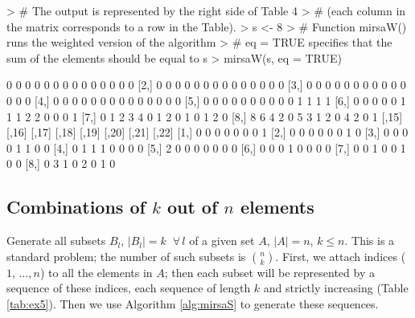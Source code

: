 \documentclass[11pt]{article}
\begin{document}
\begin{Schunk}
\begin{Sinput}
> # The output is represented by the right side of Table 4
> # (each column in the matrix corresponds to a row in the Table).
> s <- 8
> # Function mirsaW() runs the weighted version of the algorithm 
> # eq = TRUE specifies that the sum of the elements should be equal to s 
> mirsaW(s, eq = TRUE)  
\end{Sinput}
\begin{Soutput}
     [,1] [,2] [,3] [,4] [,5] [,6] [,7] [,8] [,9] [,10] [,11] [,12] [,13] [,14]
[1,]    0    0    0    0    0    0    0    0    0     0     0     0     0     0
[2,]    0    0    0    0    0    0    0    0    0     0     0     0     0     0
[3,]    0    0    0    0    0    0    0    0    0     0     0     0     0     0
[4,]    0    0    0    0    0    0    0    0    0     0     0     0     0     0
[5,]    0    0    0    0    0    0    0    0    0     0     1     1     1     1
[6,]    0    0    0    0    0    1    1    1    2     2     0     0     0     1
[7,]    0    1    2    3    4    0    1    2    0     1     0     1     2     0
[8,]    8    6    4    2    0    5    3    1    2     0     4     2     0     1
     [,15] [,16] [,17] [,18] [,19] [,20] [,21] [,22]
[1,]     0     0     0     0     0     0     0     1
[2,]     0     0     0     0     0     0     1     0
[3,]     0     0     0     0     1     1     0     0
[4,]     0     1     1     1     0     0     0     0
[5,]     2     0     0     0     0     0     0     0
[6,]     0     0     0     1     0     0     0     0
[7,]     0     0     1     0     0     1     0     0
[8,]     0     3     1     0     2     0     1     0
\end{Soutput}
\end{Schunk}

\subsection{Combinations of $k$ out of $n$ elements} \label{sec:ex5}

Generate all subsets $B_l$, $|B_l| = k \;\; \forall \, l$ of a given set $A$, $|A| = n$, $k \leqslant n$. This is a standard problem; the number of such subsets is ${n \choose k}$. First, we attach indices ($1, \, \dotsc, n$) to all the elements in $A$; then each subset will be represented by a sequence of these indices, each sequence of length $k$ and strictly increasing (Table \ref{tab:ex5}). Then we use Algorithm \ref{alg:mirsaS} to generate these sequences. \\
\end{document}
